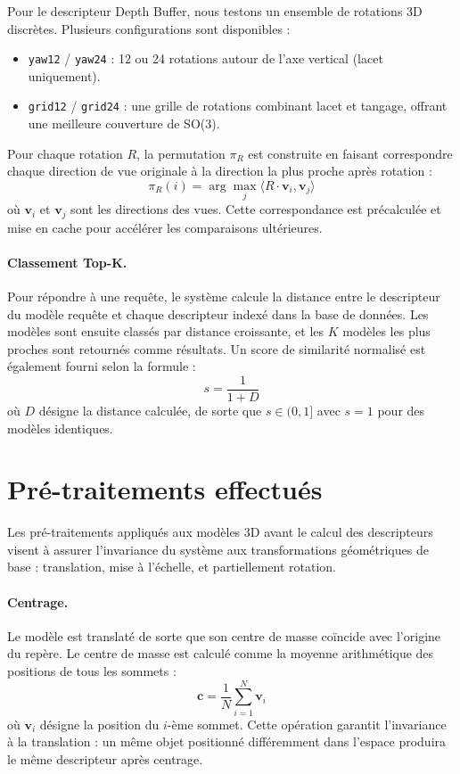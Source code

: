 \documentclass[11pt,a4paper,oneside]{report}
\begin{document}
Pour le descripteur Depth Buffer, nous testons un ensemble de rotations 3D discrètes. Plusieurs configurations sont disponibles :
\begin{itemize}
    \item \texttt{yaw12} / \texttt{yaw24} : 12 ou 24 rotations autour de l'axe vertical (lacet uniquement).
    \item \texttt{grid12} / \texttt{grid24} : une grille de rotations combinant lacet et tangage, offrant une meilleure couverture de SO(3).
\end{itemize}

Pour chaque rotation $R$, la permutation $\pi_R$ est construite en faisant correspondre chaque direction de vue originale à la direction la plus proche après rotation :
$$\pi_R(i) = \arg\max_{j} \langle R \cdot \mathbf{v}_i, \mathbf{v}_j \rangle$$
où $\mathbf{v}_i$ et $\mathbf{v}_j$ sont les directions des vues. Cette correspondance est précalculée et mise en cache pour accélérer les comparaisons ultérieures.

\paragraph{Classement Top-K.} Pour répondre à une requête, le système calcule la distance entre le descripteur du modèle requête et chaque descripteur indexé dans la base de données. Les modèles sont ensuite classés par distance croissante, et les $K$ modèles les plus proches sont retournés comme résultats. Un score de similarité normalisé est également fourni selon la formule :
$$s = \frac{1}{1 + D}$$
où $D$ désigne la distance calculée, de sorte que $s \in (0, 1]$ avec $s = 1$ pour des modèles identiques.

\section{Pré-traitements effectués}

Les pré-traitements appliqués aux modèles 3D avant le calcul des descripteurs visent à assurer l'invariance du système aux transformations géométriques de base : translation, mise à l'échelle, et partiellement rotation.

\paragraph{Centrage.} Le modèle est translaté de sorte que son centre de masse coïncide avec l'origine du repère. Le centre de masse est calculé comme la moyenne arithmétique des positions de tous les sommets :
$$\mathbf{c} = \frac{1}{N} \sum_{i=1}^{N} \mathbf{v}_i$$
où $\mathbf{v}_i$ désigne la position du $i$-ème sommet. Cette opération garantit l'invariance à la translation : un même objet positionné différemment dans l'espace produira le même descripteur après centrage.
\end{document}
